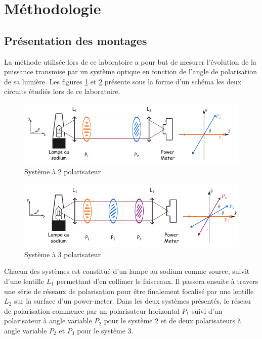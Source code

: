 \documentclass[11pt,letterpaper]{article}
\begin{document}

\section{Méthodologie}


\subsection{Présentation des montages}

La méthode utilisée lors de ce laboratoire a pour but de mesurer l'évolution de la puissance transmise par un système optique en fonction de l'angle de polarisation de sa lumière. Les figures \ref{systeme a 2 polarisateur} et \ref{systeme a 3 polarisateur} présente sous la forme d'un schéma les deux circuits étudiés lors de ce laboratoire.

\begin{figure}[H]
  \centering
        \includegraphics[scale=0.71]{Systeme2polarisateurs.png}
        \caption{Système à 2 polarisateur}
        \label{systeme a 2 polarisateur}
\end{figure}

\begin{figure}[H]
  \centering
        \includegraphics[scale=0.71]{Systeme3polarisateurs.png}
        \caption{Système à 3 polarisateur}
        \label{systeme a 3 polarisateur}
\end{figure}

Chacun des systèmes est constitué d'un lampe au sodium comme source, suivit d'une lentille $L_1$ permettant d'en collimer le faisceaux. Il passera ensuite à travers une série de réseaux de polarisation pour être finalement focalisé par une lentille $L_2$ sur la surface d'un power-meter. Dans les deux systèmes présentés, le réseau de polarisation commence par un polarisateur horizontal $P_1$ suivi d'un polarisateur à angle variable $P_2$ pour le système 2 et de deux polarisateurs à angle variable $P_2$ et $P_3$ pour le système 3.
\end{document}
